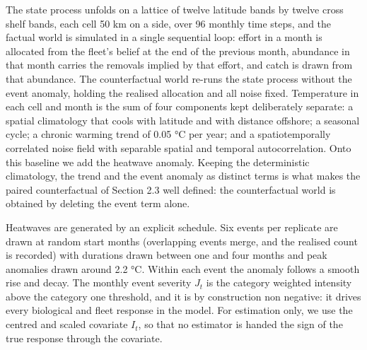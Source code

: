 \documentclass[
  11pt,
  a4paper,
]{article}
\begin{document}
The state process unfolds on a lattice of twelve latitude bands by
twelve cross shelf bands, each cell 50 km on a side, over 96 monthly
time steps, and the factual world is simulated in a single sequential
loop: effort in a month is allocated from the fleet's belief at the end
of the previous month, abundance in that month carries the removals
implied by that effort, and catch is drawn from that abundance. The
counterfactual world re-runs the state process without the event
anomaly, holding the realised allocation and all noise fixed.
Temperature in each cell and month is the sum of four components kept
deliberately separate: a spatial climatology that cools with latitude
and with distance offshore; a seasonal cycle; a chronic warming trend of
0.05 °C per year; and a spatiotemporally correlated noise field with
separable spatial and temporal autocorrelation. Onto this baseline we
add the heatwave anomaly. Keeping the deterministic climatology, the
trend and the event anomaly as distinct terms is what makes the paired
counterfactual of Section 2.3 well defined: the counterfactual world is
obtained by deleting the event term alone.

Heatwaves are generated by an explicit schedule. Six events per
replicate are drawn at random start months (overlapping events merge,
and the realised count is recorded) with durations drawn between one and
four months and peak anomalies drawn around 2.2 °C. Within each event
the anomaly follows a smooth rise and decay. The monthly event severity
\(J_t\) is the category weighted intensity above the category one
threshold, and it is by construction non negative: it drives every
biological and fleet response in the model. For estimation only, we use
the centred and scaled covariate \(I_t\), so that no estimator is handed
the sign of the true response through the covariate.
\end{document}
